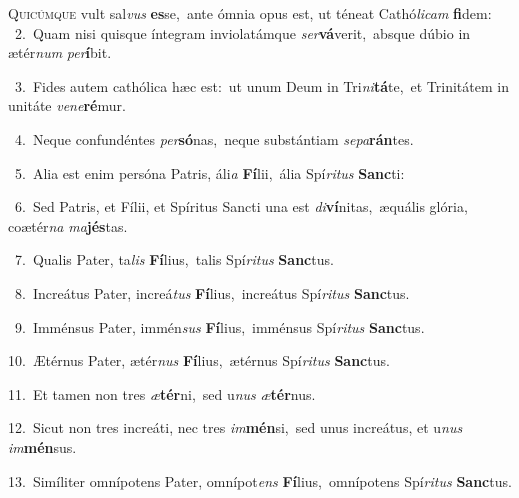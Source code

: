 \lettrine{\initial\textcolor{\initialcolor}{Q}}{uicúmque} vult sal\textit{vus} \textbf{es}\-se,~\star ante ómnia opus est, ut téneat Cathó\-\textit{li}\-\textit{cam} \textbf{fi}\-dem:\\
{\numbfont\textcolor{\numbcolor}{~2.}}~Quam nisi quisque íntegram inviolatámque \textit{ser}\-\textbf{vá}verit,~\star absque dúbio in ætér\textit{num} \textit{per}\-\textbf{í}bit.\par
{\numbfont\textcolor{\numbcolor}{~3.}}~Fides autem cathólica hæc est:~\dagger ut unum Deum in Tri\-\textit{ni}\-\textbf{tá}te,~\star et Trinitátem in unitáte \textit{ve}\-\textit{ne}\textbf{ré}mur.\par
{\numbfont\textcolor{\numbcolor}{~4.}}~Neque confundéntes \textit{per}\-\textbf{só}nas,~\star neque substántiam \textit{se}\-\textit{pa}\textbf{rán}tes.\par
{\numbfont\textcolor{\numbcolor}{~5.}}~Alia est enim persóna Patris, áli\textit{a} \textbf{Fí}\-lii,~\star ália Spí\-\textit{ri}\-\textit{tus} \textbf{Sanc}\-ti:\par
{\numbfont\textcolor{\numbcolor}{~6.}}~Sed Patris, et Fílii, et Spíritus Sancti una est \textit{di}\-\textbf{ví}nitas,~\star æquális glória, coætér\textit{na} \textit{ma}\-\textbf{jés}tas.\par
{\numbfont\textcolor{\numbcolor}{~7.}}~Qualis Pater, ta\textit{lis} \textbf{Fí}\-lius,~\star talis Spí\-\textit{ri}\-\textit{tus} \textbf{Sanc}\-tus.\par
{\numbfont\textcolor{\numbcolor}{~8.}}~Increátus Pater, increá\textit{tus} \textbf{Fí}\-lius,~\star increátus Spí\-\textit{ri}\-\textit{tus} \textbf{Sanc}\-tus.\par
{\numbfont\textcolor{\numbcolor}{~9.}}~Imménsus Pater, immén\textit{sus} \textbf{Fí}\-lius,~\star imménsus Spí\-\textit{ri}\-\textit{tus} \textbf{Sanc}\-tus.\par
{\numbfont\textcolor{\numbcolor}{10.}}~Ætérnus Pater, ætér\textit{nus} \textbf{Fí}\-lius,~\star ætérnus Spí\-\textit{ri}\-\textit{tus} \textbf{Sanc}\-tus.\par
{\numbfont\textcolor{\numbcolor}{11.}}~Et tamen non tres \textit{æ}\-\textbf{tér}ni,~\star sed u\textit{nus} \textit{æ}\-\textbf{tér}nus.\par
{\numbfont\textcolor{\numbcolor}{12.}}~Sicut non tres increáti, nec tres \textit{im}\-\textbf{mén}si,~\star sed unus increátus, et u\textit{nus} \textit{im}\-\textbf{mén}sus.\par
{\numbfont\textcolor{\numbcolor}{13.}}~Simíliter omnípotens Pater, omnípot\textit{ens} \textbf{Fí}\-lius,~\star omnípotens Spí\-\textit{ri}\-\textit{tus} \textbf{Sanc}\-tus.\par
